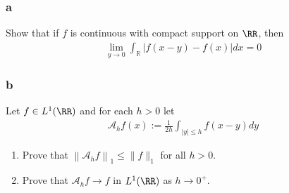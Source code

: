 \hypertarget{a-13}{%
\subsubsection{a}\label{a-13}}

Show that if \(f\) is continuous with compact support on \(\RR\), then
\begin{align*}
\lim _{y \rightarrow 0} \int_{\mathbb{R}}|f(x-y)-f(x)| d x=0
\end{align*}

\hypertarget{b-13}{%
\subsubsection{b}\label{b-13}}

Let \(f\in L^1(\RR)\) and for each \(h > 0\) let
\begin{align*}
\mathcal{A}_{h} f(x):=\frac{1}{2 h} \int_{|y| \leq h} f(x-y) d y
\end{align*}

\begin{enumerate}
\def\labelenumi{\roman{enumi}.}
\item
  Prove that \(\left\|\mathcal{A}_{h} f\right\|_{1} \leq\|f\|_{1}\) for
  all \(h > 0\).
\item
  Prove that \(\mathcal{A}_h f → f\) in \(L^1(\RR)\) as \(h → 0^+\).
\end{enumerate}


